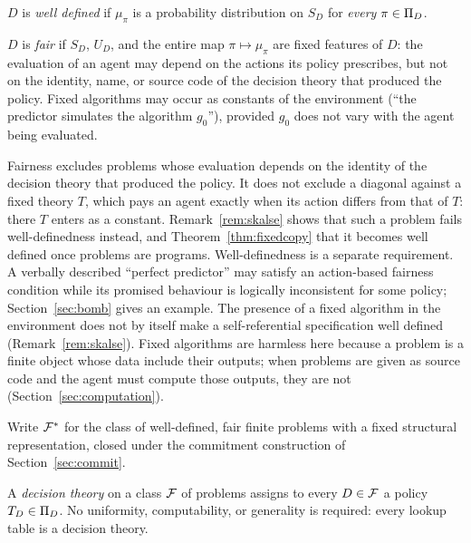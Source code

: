 \begin{definition}\label{def:welldefined}
$D$ is \emph{well defined} if $\mu_\pi$ is a probability distribution on $S_D$ for \emph{every}
$\pi\in\Pi_D$.
\end{definition}

\begin{definition}[Fairness]\label{def:fair}
$D$ is \emph{fair} if $S_D$, $U_D$, and the entire map $\pi\mapsto\mu_\pi$ are fixed features of $D$:
the evaluation of an agent may depend on the actions its policy prescribes, but not on the
identity, name, or source code of the decision theory that produced the policy. Fixed algorithms
may occur as constants of the environment (\enquote{the predictor simulates the algorithm $g_0$}),
provided $g_0$ does not vary with the agent being evaluated.
\end{definition}

Fairness excludes problems whose evaluation depends on the identity of the decision theory that
produced the policy. It does not exclude a diagonal against a fixed theory $T$, which pays an agent
exactly when its action differs from that of $T$: there $T$ enters as a constant.
Remark~\ref{rem:skalse} shows that such a problem fails well-definedness instead, and
Theorem~\ref{thm:fixedcopy} that it becomes well defined once problems are programs. Well-definedness is a separate requirement. A verbally described \enquote{perfect
predictor} may satisfy an action-based fairness condition while its promised behaviour is
logically inconsistent for some policy; Section~\ref{sec:bomb} gives an example. The presence of a
fixed algorithm in the environment does not by itself make a self-referential specification well
defined (Remark~\ref{rem:skalse}). Fixed algorithms are harmless here because a problem is a finite
object whose data include their outputs; when problems are given as source code and the agent must
compute those outputs, they are not (Section~\ref{sec:computation}).

Write $\mathcal{F}^*$ for the class of well-defined, fair finite problems with a fixed structural
representation, closed under the commitment construction of Section~\ref{sec:commit}.

\begin{definition}\label{def:theory}
A \emph{decision theory} on a class $\mathcal{F}$ of problems assigns to every $D\in\mathcal{F}$ a policy
$T_D\in\Pi_D$. No uniformity, computability, or generality is required: every lookup table is a
decision theory.
\end{definition}


